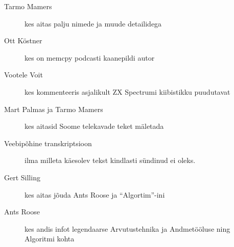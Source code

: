 \begin{description}
	\item[Tarmo Mamers] kes aitas palju nimede ja muude detailidega
	\item[Ott Köstner] kes on memcpy podcasti 
kaanepildi autor
	\item[Vootele Voit] kes kommenteeris 
asjalikult ZX Spectrumi kiibistikku puudutavat
	\item[Mart Palmas ja Tarmo Mamers] kes aitasid Soome telekavade teket mäletada 
	\item[Veebipõhine transkriptsioon] ilma milleta käesolev tekst 
kindlasti sündinud ei oleks. 
	\item[Gert Silling] kes aitas jõuda Ants Roose ja \enquote{Algortim}-ini 
	\item[Ants Roose] kes andis infot legendaarse Arvutustehnika ja Andmetööluse ning Algoritmi kohta 
\end{description}
